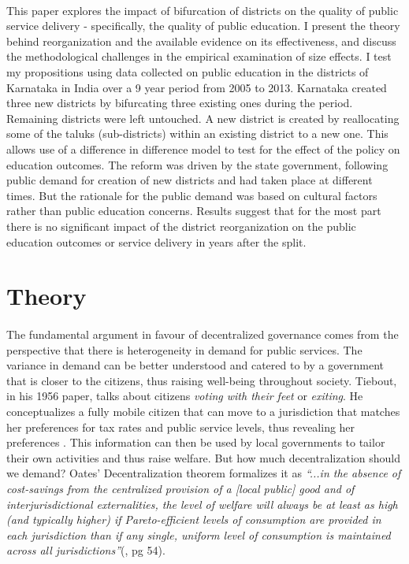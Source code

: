 \documentclass[12pt, a4paper]{article}
\begin{document}
\paragraph{}This paper explores the impact of bifurcation of districts on the quality of public service delivery - specifically, the quality of public education. I present the theory behind reorganization and the available evidence on its effectiveness, and discuss the methodological challenges in the empirical examination of size effects. I test my propositions using data collected on public education in the districts of Karnataka in India over a 9 year period from 2005 to 2013. Karnataka created three new districts by bifurcating three existing ones during the period. Remaining districts were left untouched. A new district is created by reallocating some of the taluks (sub-districts) within an existing district to a new one. This allows use of a difference in difference model to test for the effect of the policy on education outcomes. The reform was driven by the state government, following public demand for creation of new districts and had taken place at different times. But the rationale for the public demand was based on cultural factors rather than public education concerns. Results suggest that for the most part there is no significant impact of the district reorganization on the public education outcomes or service delivery in years after the split.

\section*{Theory}
\paragraph{} The fundamental argument in favour of decentralized governance comes from the perspective that there is heterogeneity in demand for public services. The variance in demand can be better understood and catered to by a government that is closer to the citizens, thus raising well-being throughout society. Tiebout, in his 1956 paper, talks about citizens \textit{voting with their feet} or \textit{exiting}. He conceptualizes a fully mobile citizen that can move to a jurisdiction that matches her preferences for tax rates and public service levels, thus revealing her preferences \parencite{tiebout_economies_1960}. This information can then be used by local governments to tailor their own activities and thus raise welfare. But how much decentralization should we demand? Oates' Decentralization theorem formalizes it as \textit{``...in the absence of cost-savings from the centralized provision of a [local public] good and of interjurisdictional externalities, the level of welfare will always be at least as high (and typically higher) if Pareto-efficient levels of consumption are provided in each jurisdiction than if any single, uniform level of consumption is maintained across all jurisdictions''}(\cite{oates_fiscal_1972}, pg 54). \nocite{oates1999essay}
\end{document}
